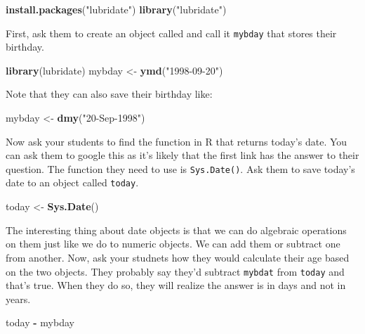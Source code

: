 \documentclass[]{book}
\newenvironment{Shaded}{\begin{snugshade}}{\end{snugshade}}
\newcommand{\KeywordTok}[1]{\textcolor[rgb]{0.13,0.29,0.53}{\textbf{#1}}}
\newcommand{\NormalTok}[1]{#1}
\newcommand{\OperatorTok}[1]{\textcolor[rgb]{0.81,0.36,0.00}{\textbf{#1}}}
\newcommand{\StringTok}[1]{\textcolor[rgb]{0.31,0.60,0.02}{#1}}
\begin{document}
\begin{Shaded}
\begin{Highlighting}[]
\KeywordTok{install.packages}\NormalTok{(}\StringTok{"lubridate"}\NormalTok{)}
\KeywordTok{library}\NormalTok{(}\StringTok{"lubridate"}\NormalTok{)}
\end{Highlighting}
\end{Shaded}

First, ask them to create an object called and call it \texttt{mybday} that stores their birthday.

\begin{Shaded}
\begin{Highlighting}[]
\KeywordTok{library}\NormalTok{(lubridate)}
\NormalTok{mybday <-}\StringTok{ }\KeywordTok{ymd}\NormalTok{(}\StringTok{"1998-09-20"}\NormalTok{)}
\end{Highlighting}
\end{Shaded}

Note that they can also save their birthday like:

\begin{Shaded}
\begin{Highlighting}[]
\NormalTok{mybday <-}\StringTok{ }\KeywordTok{dmy}\NormalTok{(}\StringTok{"20-Sep-1998"}\NormalTok{)}
\end{Highlighting}
\end{Shaded}

Now ask your students to find the function in R that returns today's date. You can ask them to google this as it's likely that the first link has the answer to their question. The function they need to use is \texttt{Sys.Date()}. Ask them to save today's date to an object called \texttt{today}.

\begin{Shaded}
\begin{Highlighting}[]
\NormalTok{today <-}\StringTok{ }\KeywordTok{Sys.Date}\NormalTok{()}
\end{Highlighting}
\end{Shaded}

The interesting thing about date objects is that we can do algebraic operations on them just like we do to numeric objects. We can add them or subtract one from another. Now, ask your studnets how they would calculate their age based on the two objects. They probably say they'd subtract \texttt{mybdat} from \texttt{today} and that's true. When they do so, they will realize the answer is in days and not in years.

\begin{Shaded}
\begin{Highlighting}[]
\NormalTok{today }\OperatorTok{-}\StringTok{ }\NormalTok{mybday}
\end{Highlighting}
\end{Shaded}
\end{document}
